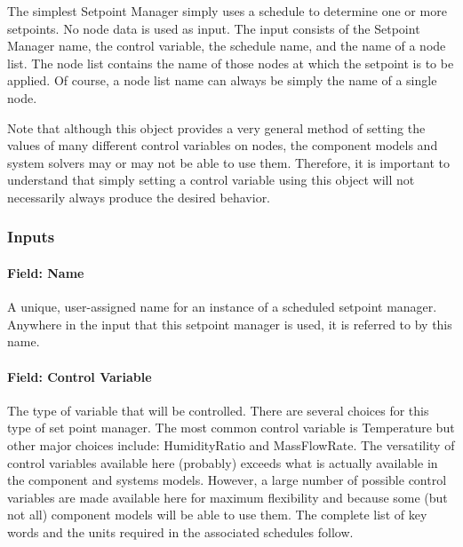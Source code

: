 The simplest Setpoint Manager simply uses a schedule to determine one or more setpoints. No node data is used as input. The input consists of the Setpoint Manager name, the control variable, the schedule name, and the name of a node list. The node list contains the name of those nodes at which the setpoint is to be applied. Of course, a node list name can always be simply the name of a single node.

Note that although this object provides a very general method of setting the values of many different control variables on nodes, the component models and system solvers may or may not be able to use them. Therefore, it is important to understand that simply setting a control variable using this object will not necessarily always produce the desired behavior.

\subsubsection{Inputs}\label{inputs-043}

\paragraph{Field: Name}\label{field-name-042}

A unique, user-assigned name for an instance of a scheduled setpoint manager. Anywhere in the input that this setpoint manager is used, it is referred to by this name.

\paragraph{Field: Control Variable}\label{field-control-variable-000}

The type of variable that will be controlled. There are several choices for this type of set point manager. The most common control variable is Temperature but other major choices include: HumidityRatio and MassFlowRate. The versatility of control variables available here (probably) exceeds what is actually available in the component and systems models. However, a large number of possible control variables are made available here for maximum flexibility and because some (but not all) component models will be able to use them. The complete list of key words and the units required in the associated schedules follow.

